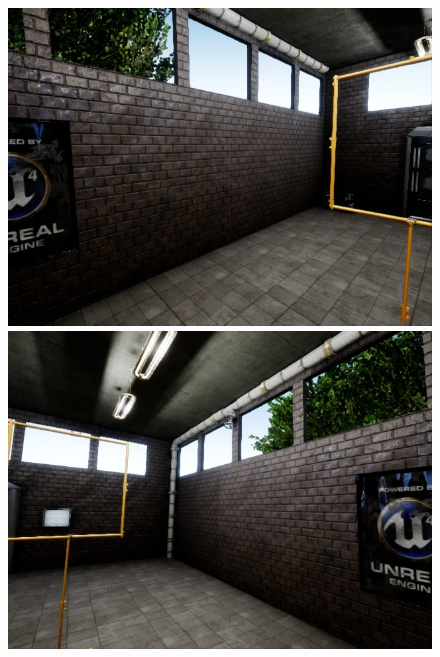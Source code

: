 \documentclass{article}
\begin{document}
\begin{figure}[htbp]
	\begin{minipage}{0.3\linewidth}
	\includegraphics[width=\linewidth]{size_examples/01-015 (1).jpg}
\end{minipage}
\hfill
\begin{minipage}{0.3\linewidth}
	\includegraphics[width=\linewidth]{size_examples/01-015 (9).jpg}
\end{minipage}
\hfill
\begin{minipage}{0.3\linewidth}

\end{minipage}
\end{figure}
\end{document}
